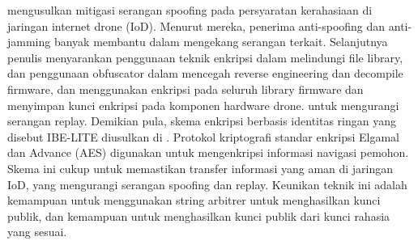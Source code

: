 \citet{dey2018security} mengusulkan mitigasi serangan spoofing pada persyaratan kerahasiaan di jaringan internet drone (IoD). Menurut mereka, penerima anti-spoofing dan anti-jamming banyak membantu dalam mengekang serangan terkait. Selanjutnya penulis menyarankan penggunaan teknik enkripsi dalam melindungi file library, dan penggunaan obfuscator dalam mencegah reverse engineering dan decompile firmware, dan menggunakan enkripsi pada seluruh library firmware dan menyimpan kunci enkripsi pada komponen hardware drone. untuk mengurangi serangan replay. Demikian pula, skema enkripsi berbasis identitas ringan yang disebut IBE-LITE diusulkan di \citep{lin2018security}. Protokol kriptografi standar enkripsi Elgamal dan Advance (AES) digunakan untuk mengenkripsi informasi navigasi pemohon. Skema ini cukup untuk memastikan transfer informasi yang aman di jaringan IoD, yang mengurangi serangan spoofing dan replay. Keunikan teknik ini adalah kemampuan untuk menggunakan string arbitrer untuk menghasilkan kunci publik, dan kemampuan untuk menghasilkan kunci publik dari kunci rahasia yang sesuai.
